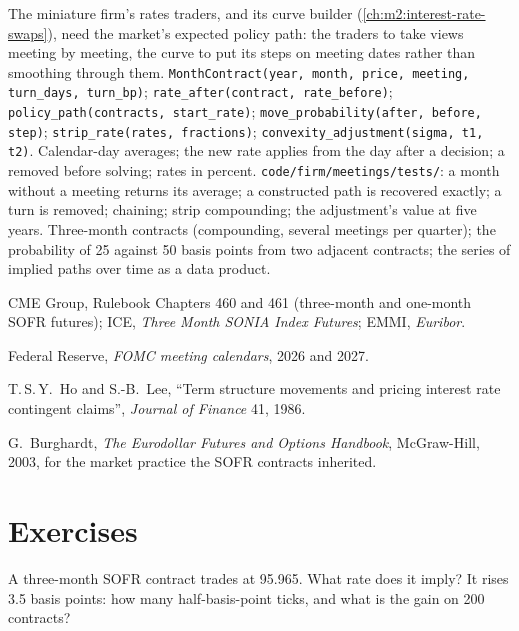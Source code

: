 \begin{build}
 The miniature firm's rates traders, and its curve builder
(\cref{ch:m2:interest-rate-swaps}), need the market's expected policy path:
the traders to take views meeting by meeting, the curve to put its steps on
meeting dates rather than smoothing through them.
 \texttt{MonthContract(year, month, price, meeting,
turn\_days, turn\_bp)}; \texttt{rate\_after(contract, rate\_before)};
\texttt{policy\_path(contracts, start\_rate)};
\texttt{move\_probability(after, before, step)};
\texttt{strip\_rate(rates, fractions)};
\texttt{convexity\_adjustment(sigma, t1, t2)}.
 Calendar-day averages; the new rate applies from the day after
a decision; a  removed before solving; rates in percent.
 \texttt{code/firm/meetings/tests/}: a month without
a meeting returns its average; a constructed path is recovered exactly; a
turn is removed; chaining; strip compounding; the adjustment's value at five
years.
 Three-month contracts (compounding, several meetings per
quarter); the probability of 25 against 50 basis points from two adjacent
contracts; the series of implied paths over time as a data product.
\end{build}

\begin{omsources}
\item CME Group, Rulebook Chapters 460 and 461 (three-month and one-month SOFR
futures); ICE, \emph{Three Month SONIA Index Futures}; EMMI, \emph{Euribor}.
\item Federal Reserve, \emph{FOMC meeting calendars}, 2026 and 2027.
\item T.\,S.\,Y.\ Ho and S.-B.\ Lee, ``Term structure movements and pricing
interest rate contingent claims'', \emph{Journal of Finance} 41, 1986.
\item G.\ Burghardt, \emph{The Eurodollar Futures and Options Handbook},
McGraw-Hill, 2003, for the market practice the SOFR contracts inherited.
\end{omsources}

\section{Exercises}

\begin{exercise}[$\star$]\label{exo:m2:short-term-interest-rate-futures:1}
A three-month SOFR contract trades at 95.965. What rate does it imply? It rises
3.5 basis points: how many half-basis-point ticks, and what is the gain on 200
contracts?
\end{exercise}

